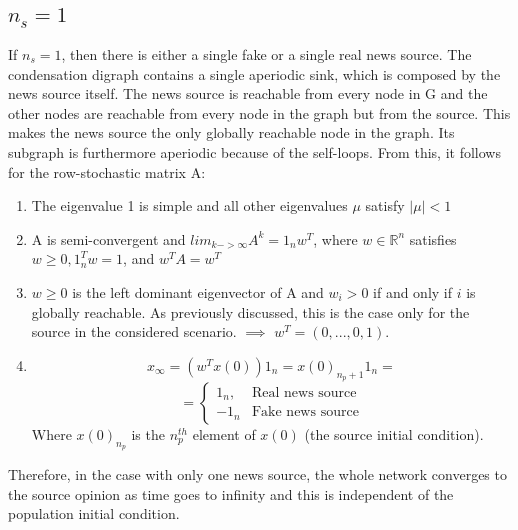 \subsection{$n_s = 1$}
If $n_s=1$, then there is either a single fake or a single real news source. The condensation digraph contains a single aperiodic sink, which is composed by the news source itself. The news source is reachable from every node in G and the other nodes are reachable from every node in the graph but from the source. This makes the news source the only globally reachable node in the graph. Its subgraph is furthermore aperiodic because of the self-loops. From this, it follows for the row-stochastic matrix A:
\begin{enumerate}
	\item
	The eigenvalue 1 is simple and all other eigenvalues $\mu$ satisfy $|\mu|<1$
	\item
	A is semi-convergent and $lim_{k->\infty} A^k = 1_n w^T$, where $w \in \mathbb{R}^n$ satisfies $w\geq0, 1_n^T w = 1$, and $w^TA=w^T$
	\item
	$w\geq0$ is the left dominant eigenvector of A and $w_i>0$ if and only if $i$ is globally reachable. As previously discussed, this is the case only for the source in the considered scenario. \newline
	$\implies$ $w^T = (0,...,0,1)$.
	\item
	$$x_\infty = (w^T x(0))1_n = x(0)_{n_p+1} 1_n=$$
	$$= \begin{cases}
	1_n,& \text{Real news source}\\
	-1_n & \text{Fake news source}
	\end{cases}$$
	Where $x(0)_{n_p}$ is the $n_p^{th}$ element of $x(0)$ (the source initial condition). 
\end{enumerate}
Therefore, in the case with only one news source, the whole network converges to the source opinion as time goes to infinity and this is independent of the population initial condition.



